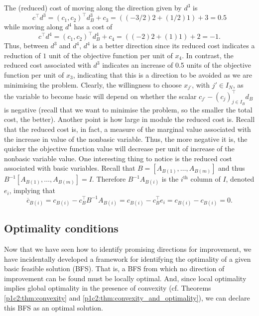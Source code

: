 The (reduced) cost of moving along the direction given by $d^3$ is 
%
\begin{equation*}
	c^\top d^3 = (c_1, c_2)^\top d_B^3 + c_3 = ((-3/2)2 + (1/2)1) + 3 = 0.5
\end{equation*}
%
while moving along $d^4$ has a cost of
\begin{equation*}
	c^\top d^4 = (c_1, c_2)^\top d_B^4 + c_4 = ((-2)2 + (1)1) + 2 = -1.
\end{equation*}
%
Thus, between $d^3$ and $d^4$, $d^4$ is a better direction since its reduced cost indicates a reduction of $1$ unit of the objective function per unit of $x_4$. In contrast, the reduced cost associated with $d^3$ indicates an increase of 0.5 units of the objective function per unit of $x_3$, indicating that this is a direction to be avoided as we are minimising the problem.
%
Clearly, the willingness to choose $x_{j'}$, with $j' \in I_N$, as the variable to become basic will depend on whether the scalar $c_{j'} - (c_j)_{j \in I_B}^\top d_B$ is negative (recall that we want to minimise the problem, so the smaller the total cost, the better). Another point is how large in module the reduced cost is. Recall that the reduced cost is, in fact, a measure of the marginal value associated with the increase in value of the nonbasic variable. Thus, the more negative it is, the quicker the objective function value will decrease per unit of increase of the nonbasic variable value.
%
One interesting thing to notice is the reduced cost associated with basic variables. Recall that $B = [A_{B(1)}, \dots, A_{B(m)}]$ and thus $B^{-1}[A_{B(1)}, \dots, A_{B(m)}] = I$. Therefore $B^{-1}A_{B(i)}$ is the $i^\text{th}$ column of $I$, denoted $e_i$, implying that
%
\begin{equation*}
	\overline{c}_{B(i)} = c_{B(i)} - c^\top_B B^{-1} A_{B(i)} = c_{B(i)} - c_B^\top e_i = c_{B(i)} - c_{B(i)} = 0.	
\end{equation*}


\subsection{Optimality conditions}

Now that we have seen how to identify promising directions for improvement, we have incidentally developed a framework for identifying the optimality of a given basic feasible solution (BFS). That is, a BFS from which no direction of improvement can be found must be locally optimal. And, since local optimality implies global optimality in the presence of convexity (cf. Theorems \ref{p1c2:thm:convexity} and \ref{p1c2:thm:convexity_and_optimality}), we can declare this BFS as an optimal solution. 

